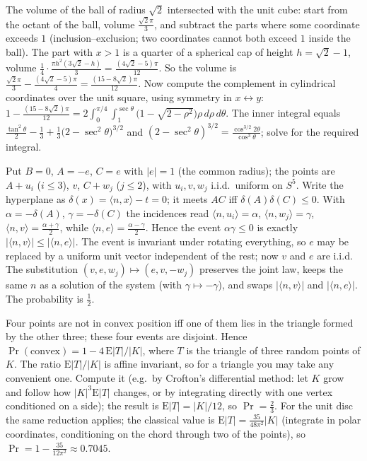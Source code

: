 \documentclass[11pt,a4paper]{article}
\begin{document}
 The volume of the ball of radius $\sqrt2$ intersected with the unit cube: start from the octant of the ball, volume $\frac{\sqrt2\pi}3$, and subtract the parts where some coordinate exceeds $1$ (inclusion--exclusion; two coordinates cannot both exceed $1$ inside the ball).
 The part with $x>1$ is a quarter of a spherical cap of height $h=\sqrt2-1$, volume $\frac14\cdot\frac{\pi h^2(3\sqrt2-h)}3=\frac{(4\sqrt2-5)\pi}{12}$. So the volume is $\frac{\sqrt2\pi}3-\frac{(4\sqrt2-5)\pi}4=\frac{(15-8\sqrt2)\pi}{12}$.
 Now compute the complement in cylindrical coordinates over the unit square, using symmetry in $x\leftrightarrow y$: $1-\frac{(15-8\sqrt2)\pi}{12}=2\int_0^{\pi/4}\int_1^{\sec\theta}\big(1-\sqrt{2-\rho^2}\big)\rho\,d\rho\,d\theta$. The inner integral equals $\frac{\tan^2\theta}2-\frac13+\frac13\big(2-\sec^2\theta\big)^{3/2}$ and $(2-\sec^2\theta)^{3/2}=\frac{\cos^{3/2}2\theta}{\cos^3\theta}$; solve for the required integral.

 Put $B=0$, $A=-e$, $C=e$ with $|e|=1$ (the common radius); the points are $A+u_i$ ($i\le3$), $v$, $C+w_j$ ($j\le2$), with $u_i,v,w_j$ i.i.d.\ uniform on $S^5$. Write the hyperplane as $\delta(x)=\langle n,x\rangle-t=0$; it meets $AC$ iff $\delta(A)\delta(C)\le0$.
 With $\alpha=-\delta(A)$, $\gamma=-\delta(C)$ the incidences read $\langle n,u_i\rangle=\alpha$, $\langle n,w_j\rangle=\gamma$, $\langle n,v\rangle=\frac{\alpha+\gamma}2$, while $\langle n,e\rangle=\frac{\alpha-\gamma}2$. Hence the event $\alpha\gamma\le0$ is exactly $|\langle n,v\rangle|\le|\langle n,e\rangle|$.
 The event is invariant under rotating everything, so $e$ may be replaced by a uniform unit vector independent of the rest; now $v$ and $e$ are i.i.d. The substitution $(v,e,w_j)\mapsto(e,v,-w_j)$ preserves the joint law, keeps the same $n$ as a solution of the system (with $\gamma\mapsto-\gamma$), and swaps $|\langle n,v\rangle|$ and $|\langle n,e\rangle|$. The probability is $\frac12$.

 Four points are not in convex position iff one of them lies in the triangle formed by the other three; these four events are disjoint. Hence $\Pr(\text{convex})=1-4\,\mathrm E|T|/|K|$, where $T$ is the triangle of three random points of $K$.
 The ratio $\mathrm E|T|/|K|$ is affine invariant, so for a triangle you may take any convenient one. Compute it (e.g.\ by Crofton's differential method: let $K$ grow and follow how $|K|^3\mathrm E|T|$ changes, or by integrating directly with one vertex conditioned on a side); the result is $\mathrm E|T|=|K|/12$, so $\Pr=\frac23$.
 For the unit disc the same reduction applies; the classical value is $\mathrm E|T|=\frac{35}{48\pi^2}|K|$ (integrate in polar coordinates, conditioning on the chord through two of the points), so $\Pr=1-\frac{35}{12\pi^2}\approx0.7045$.
\end{document}
